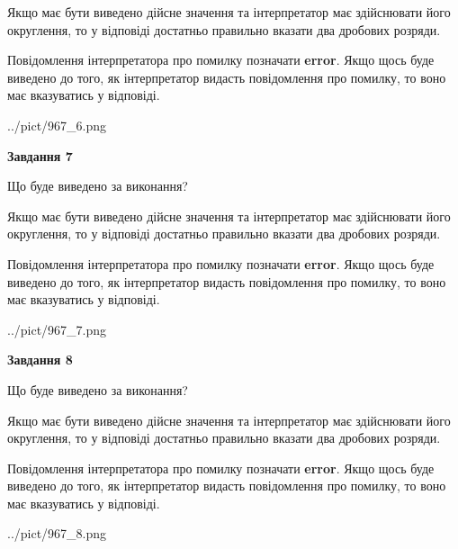 \documentclass[12pt, ukrainian]{article}
\begin{document}
{\begin {Large}
Якщо має бути виведено дійсне значення та інтерпретатор має здійснювати його округлення, 
то у відповіді достатньо правильно вказати два дробових розряди.

Повідомлення інтерпретатора про помилку позначати \textbf{error}.
Якщо щось буде виведено до того, як інтерпретатор видасть повідомлення про помилку, 
то воно має вказуватись у відповіді. \par

\begin{center}
	{../pict/967_6.png}
\end{center}
\newpage

{\begin {center}\textbf{Завдання 7}\end {center}}\par
Що буде виведено за виконання? \par

Якщо має бути виведено дійсне значення та інтерпретатор має здійснювати його округлення, 
то у відповіді достатньо правильно вказати два дробових розряди.

Повідомлення інтерпретатора про помилку позначати \textbf{error}.
Якщо щось буде виведено до того, як інтерпретатор видасть повідомлення про помилку, 
то воно має вказуватись у відповіді. \par

\begin{center}
	{../pict/967_7.png}
\end{center}
\newpage

{\begin {center}\textbf{Завдання 8}\end {center}}\par
Що буде виведено за виконання? \par

Якщо має бути виведено дійсне значення та інтерпретатор має здійснювати його округлення, 
то у відповіді достатньо правильно вказати два дробових розряди.

Повідомлення інтерпретатора про помилку позначати \textbf{error}.
Якщо щось буде виведено до того, як інтерпретатор видасть повідомлення про помилку, 
то воно має вказуватись у відповіді. \par

\begin{center}
	{../pict/967_8.png}
\end{center}
\newpage


\end{Large}}
\end{document}
